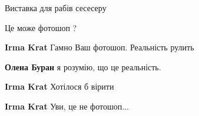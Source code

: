\begin{itemize}
 
Виставка для рабів сесесеру

 
Це може фотошоп ?

\begin{itemize}
 
\textbf{Irma Krat} Гамно Ваш фотошоп. Реальність рулить

 
\textbf{Олена Буран} я розумію, що це реальність.

 
\textbf{Irma Krat}
Хотілося б вірити

 
\textbf{Irma Krat} Уви, це не фотошоп...
\end{itemize}

 

\end{itemize}
